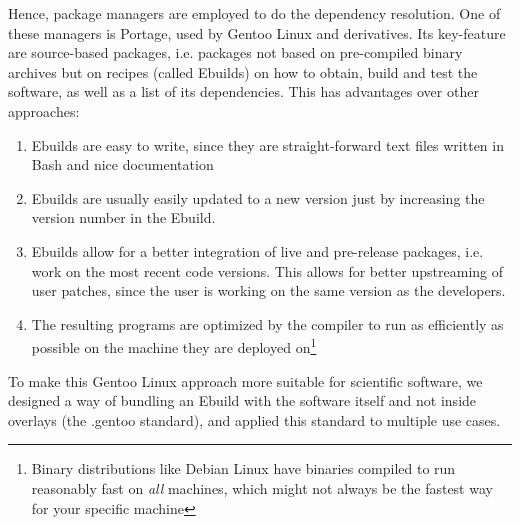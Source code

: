 \documentclass[11pt]{scrartcl}
\begin{document}
		Hence, package managers are employed to do the dependency resolution.
		One of these managers is Portage, used by Gentoo Linux and derivatives.
		Its key-feature are source-based packages, i.e. packages not based on pre-compiled binary archives but on recipes (called Ebuilds) on how to obtain, build and test the software, as well as a list of its dependencies.
		This has advantages over other approaches:
		\begin{enumerate}
			\item Ebuilds are easy to write, since they are straight-forward text files written in Bash and nice documentation
			\item Ebuilds are usually easily updated to a new version just by increasing the version number in the Ebuild.
			\item Ebuilds allow for a better integration of live and pre-release packages, i.e. work on the most recent code versions.
			This allows for better upstreaming of user patches, since the user is working on the same version as the developers.
			\item The resulting programs are optimized by the compiler to run as efficiently as possible on the machine they are deployed on\footnote{Binary distributions like Debian Linux have binaries compiled to run reasonably fast on \emph{all} machines, which might not always be the fastest way for your specific machine}
		\end{enumerate}
		
		To make this Gentoo Linux approach more suitable for scientific software, we designed a way of bundling an Ebuild with the software itself and not inside overlays (the .gentoo standard), and applied this standard to multiple use cases.
	
	
	
	
	\appendix
	
\end{document}
